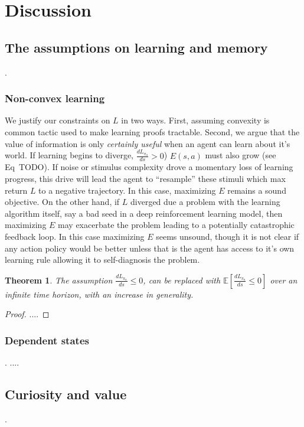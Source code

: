 \documentclass[9pt,twocolumn,twoside]{pnas-new}
\newtheorem{theorem}{Theorem}
\begin{document}
\section{Discussion}

\subsection*{The assumptions on learning and memory}.
\subsubsection{Non-convex learning}
We justify our constraints on $L$ in two ways. First, assuming convexity is common tactic used to make learning proofs tractable. Second, we argue that the value of information is only \textit{certainly useful} when an agent can learn about it's world. If learning begins to diverge, $\frac{dL_{\pi_{a}}}{ds} > 0$) $E(s, a)$ must also grow (see Eq~TODO). If noise or stimulus complexity drove a momentary loss of learning progress, this drive will lead the agent to ``resample'' these stimuli which max return $L$ to a negative trajectory. In this case, maximizing $E$ remains a sound objective. On the other hand, if $L$ diverged due a problem with the learning algorithm itself, say a bad seed in a deep reinforcement learning model, then maximizing $E$ may exacerbate the problem leading to a potentially catastrophic feedback loop. In this case maximizing $E$ seems unsound, though it is not clear if any action policy would be better unless that is the agent has access to it's own learning rule allowing it to self-diagnosis the problem.

\begin{theorem}
    The assumption $\frac{dL_{\pi_{a}}}{ds} \leq 0$, can be replaced with $\mathbb{E} [\frac{dL_{\pi_{a}}}{ds} \leq 0]$ over an infinite time horizon, with an increase in generality.
\end{theorem}
\begin{proof}
....
\end{proof}


\subsubsection*{Dependent states}.
....


\subsection*{Curiosity and value}.
\end{document}
